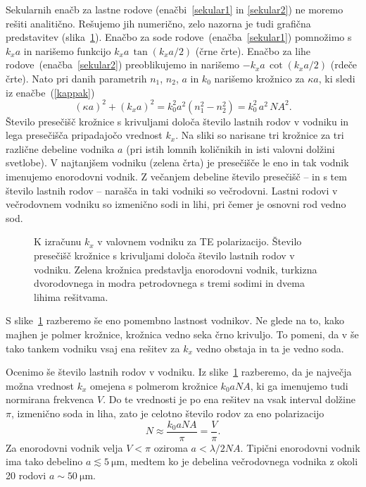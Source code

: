 Sekularnih enačb za lastne rodove (enačbi~\ref{sekular1} in \ref{sekular2}) ne moremo rešiti 
analitično. Rešujemo jih numerično, zelo nazorna je tudi grafična predstavitev
(slika~\ref{fig:TEsec}). Enačbo za sode rodove~(enačba~\ref{sekular1}) pomnožimo s 
$k_xa$ in narišemo funkcijo $k_xa\, \tan (k_xa/2)$ (črne črte). Enačbo za lihe 
rodove~(enačba~\ref{sekular2}) preoblikujemo in narišemo $-k_xa\, \cot (k_xa/2)$ (rdeče črte).
Nato pri danih parametrih $n_1$, $n_2$, $a$ in $k_0$ narišemo krožnico za $\kappa a$, 
ki sledi iz enačbe~(\ref{kappak})
\begin{equation}
 (\kappa a)^2+ (k_x a)^{2}=k_{0}^{2} a^2\left(n_{1}^{2}-n_{2}^{2}\right) = k_0^2\,a^2\,NA^2.
\end{equation}
Število presečišč krožnice s krivuljami določa število lastnih rodov v vodniku in lega presečišča
pripadajočo vrednost $k_x$. Na sliki so narisane tri krožnice za 
tri različne debeline vodnika $a$ (pri istih lomnih količnikih in isti valovni 
dolžini svetlobe). V najtanjšem vodniku (zelena črta) je presečišče
le eno in tak vodnik imenujemo enorodovni vodnik. 
Z večanjem debeline število presečišč -- in s tem število lastnih rodov -- narašča in taki vodniki so 
večrodovni. Lastni rodovi v večrodovnem vodniku
so izmenično sodi in lihi, pri čemer je osnovni rod vedno sod. 
\begin{figure}[ht]
\centering
\def\svgwidth{60truemm} 

\caption{K izračunu $k_x$ v valovnem vodniku
za TE polarizacijo. Število presečišč krožnice s krivuljami določa število lastnih rodov 
v vodniku. Zelena krožnica predstavlja enorodovni vodnik, turkizna dvorodovnega in modra
petrodovnega s tremi sodimi in dvema lihima rešitvama.}
\label{fig:TEsec}
\end{figure}

S slike~\ref{fig:TEsec} razberemo še eno pomembno lastnost vodnikov. 
Ne glede na to, kako majhen je polmer krožnice, krožnica vedno seka črno krivuljo. 
To pomeni, da v še tako tankem vodniku vsaj ena rešitev za $k_x$ vedno obstaja
in ta je vedno soda. 

Ocenimo še število lastnih rodov v vodniku. Iz slike~\ref{fig:TEsec} razberemo, da je 
največja možna vrednost $k_x$ omejena s polmerom krožnice $k_0aNA$, ki ga imenujemo
tudi normirana frekvenca $V$. Do te vrednosti je 
po ena rešitev na vsak interval dolžine $\pi$, izmenično soda in liha, 
zato je celotno število rodov za eno polarizacijo
\begin{equation}
N \approx \frac{k_0 a NA}{\pi} = \frac{V}{\pi}.
\end{equation}
Za enorodovni vodnik velja $V < \pi$ oziroma $a< \lambda/2 NA$.
Tipični enorodovni vodnik ima tako debelino $a\lesssim 5~\si{\micro\meter}$, medtem ko je
debelina večrodovnega vodnika z okoli 20 rodovi $a\sim 50~\si{\micro\meter}$.

